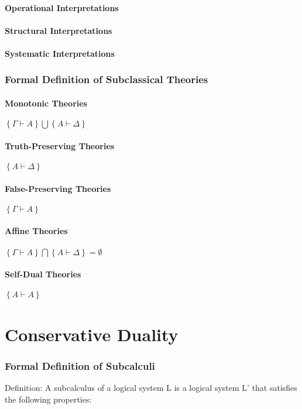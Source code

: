	\subsection{Operational Interpretations}
	\subsection{Structural Interpretations}
	\subsection{Systematic Interpretations}
\section{Formal Definition of Subclassical Theories}
	\subsection{Monotonic Theories}
	$\left\{ \Gamma \vdash A \right\} \bigcup \left\{ A \vdash \Delta \right\}$
	\subsection{Truth-Preserving Theories}
	$\left\{ A \vdash \Delta \right\}$
	\subsection{False-Preserving Theories}
	$\left\{ \Gamma \vdash A \right\}$
	\subsection{Affine Theories}
	$\left\{ \Gamma \vdash A \right\} \bigcap \left\{ A \vdash \Delta \right\}=\emptyset$
	\subsection{Self-Dual Theories}
	$\left\{ A \vdash A \right\}$

\part{Conservative Duality}
\section{Formal Definition of Subcalculi}
Definition: A subcalculus of a logical system L is a logical system L' that satisfies the following properties:

